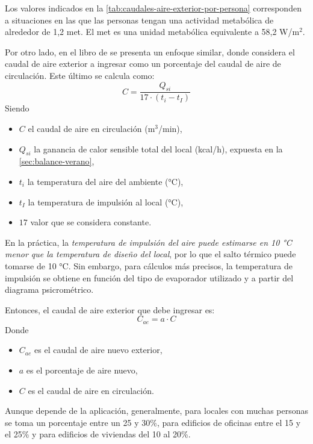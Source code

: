 Los valores indicados en la \autoref{tab:caudales-aire-exterior-por-persona} corresponden a situaciones en las que las personas tengan una actividad metab\'olica de alrededor de 1,2 met. El met es una unidad metab\'olica equivalente a 58,2 W/m$^2$.

Por otro lado, en el libro  de \textcite{quadri2020} se presenta un enfoque similar, donde considera el caudal de aire exterior a ingresar como un porcentaje del caudal de aire de circulación. Este último se calcula como:
\begin{equation}
	\label{eq:caudal-de-circulacion}
	C = \dfrac{Q_{si}}{17 \cdot (t_i - t_I)}
\end{equation}
Siendo
\begin{itemize}
	\item $C$ el caudal de aire en circulación (m$^3$/min),
	\item $Q_{si}$ la ganancia de calor sensible total del local (kcal/h), expuesta en la \autoref{sec:balance-verano},
	\item $t_i$ la temperatura del aire del ambiente (°C),
	\item $t_I$ la temperatura de impulsión al local (°C),
	\item $17$ valor que se considera constante.
\end{itemize}

En la práctica, la \emph{temperatura de impulsión del aire puede estimarse en 10 °C menor que la temperatura de diseño del local}, por lo que el salto térmico puede tomarse de 10 °C. Sin embargo, para cálculos más precisos, la temperatura de impulsión se obtiene en función del tipo de evaporador utilizado y a partir del diagrama psicrométrico. 


Entonces, el caudal de aire exterior que debe ingresar es:
\begin{equation}
	C_{ae} = a \cdot C
\end{equation}
Donde
\begin{itemize}
	\item $C_{ae}$ es el caudal de aire nuevo exterior,
	\item $a$ es el porcentaje de aire nuevo,
	\item $C$ es el caudal de aire en circulación.
\end{itemize}

Aunque depende de la aplicación, generalmente, para locales con muchas personas se toma un porcentaje entre un 25 y 30\%, para edificios de oficinas entre el 15 y el 25\% y para edificios de viviendas del 10 al 20\%.

